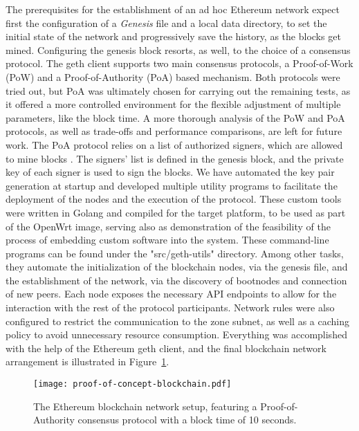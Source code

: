 The prerequisites for the establishment of an ad hoc Ethereum network expect first the configuration of a \emph{Genesis} file and a local data directory, to set the initial state of the network and progressively save the history, as the blocks get mined. Configuring the genesis block resorts, as well, to the choice of a consensus protocol. The geth client supports two main consensus protocols, a Proof-of-Work (PoW) and a Proof-of-Authority (PoA) based mechanism. Both protocols were tried out, but PoA was ultimately chosen for carrying out the remaining tests, as it offered a more controlled environment for the flexible adjustment of multiple parameters, like the block time. A more thorough analysis of the PoW and PoA protocols, as well as trade-offs and performance comparisons, are left for future work. The PoA protocol relies on a list of authorized signers, which are allowed to mine blocks \cite{clique-eth}. The signers' list is defined in the genesis block, and the private key of each signer is used to sign the blocks. We have automated the key pair generation at startup and developed multiple utility programs to facilitate the deployment of the nodes and the execution of the protocol. These custom tools were written in Golang and compiled for the target platform, to be used as part of the OpenWrt image, serving also as demonstration of the feasibility of the process of embedding custom software into the system. These command-line programs can be found under the "src/geth-utils" directory. Among other tasks, they automate the initialization of the blockchain nodes, via the genesis file, and the establishment of the network, via the discovery of bootnodes and connection of new peers. Each node exposes the necessary API endpoints to allow for the interaction with the rest of the protocol participants. Network rules were also configured to restrict the communication to the zone subnet, as well as a caching policy to avoid unnecessary resource consumption. Everything was accomplished with the help of the Ethereum geth client, and the final blockchain network arrangement is illustrated in Figure~\ref{fig:pol-implementation:blockchain-network}.

\begin{figure}[h!]
    \begin{center}
    \texttt{[image: proof-of-concept-blockchain.pdf]}
    \caption{The Ethereum blockchain network setup, featuring a Proof-of-Authority consensus protocol with a block time of 10 seconds.}
    \label{fig:pol-implementation:blockchain-network}
    \end{center}
\end{figure}

